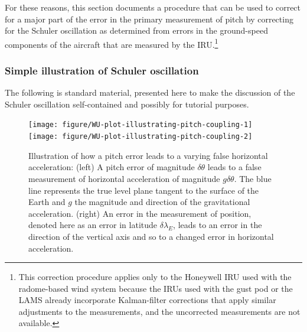 \documentclass[12pt,twoside,english]{article}\usepackage[]{graphicx}\usepackage[]{color}
\newenvironment{knitrout}{}{} %
\let\OrgIndex\index
\renewcommand*{\index}[1]{\OrgIndex{#1}}
\begin{document}
For these reasons, this section documents a procedure that can be used to correct for a major part of the error in the primary measurement of pitch by correcting for the Schuler oscillation as determined from errors in the ground-speed components of the aircraft that are measured by the IRU.\footnote{This correction procedure applies only to the Honeywell IRU used with the radome-based wind system because the IRUs used with the gust pod or the LAMS already incorporate Kalman-filter corrections that apply similar adjustments to the measurements, and the uncorrected measurements are not available.}



\subsubsection{Simple illustration of Schuler oscillation}

The following is standard material, presented here to make the discussion of the Schuler oscillation self-contained and possibly for tutorial purposes.
\begin{knitrout}\footnotesize
{}\color{fgcolor}\begin{figure}

{\centering \texttt{[image: figure/WU-plot-illustrating-pitch-coupling-1]} 
\texttt{[image: figure/WU-plot-illustrating-pitch-coupling-2]} 

}

\caption[Illustration of how a pitch error leads to a varying false horizontal acceleration]{Illustration of how a pitch error leads to a varying false horizontal acceleration: (left) A pitch error of magnitude $\delta\theta$ leads to a false measurement of horizontal acceleration of magnitude $g\delta\theta$. The blue line represents the true level plane tangent to the surface of the Earth and $g$ the magnitude and direction of the gravitational acceleration. (right) An error in the measurement of position, denoted here as an error in latitude $\delta\lambda_E$, leads to an error in the direction of the vertical axis and so to a changed error in horizontal acceleration.}\label{fig:plot-illustrating-pitch-coupling}
\end{figure}


\end{knitrout}
\end{document}
